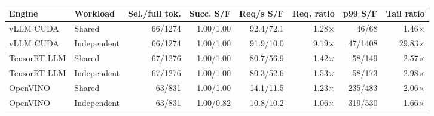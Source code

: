 \begin{tabular}{llrrrrrr}
\toprule
Engine & Workload & Sel./full tok. & Succ. S/F & Req/s S/F & Req. ratio & p99 S/F & Tail ratio \\
\midrule
vLLM CUDA & Shared & 66/1274 & 1.00/1.00 & 92.4/72.1 & 1.28$\times$ & 46/68 & 1.46$\times$ \\
vLLM CUDA & Independent & 66/1274 & 1.00/1.00 & 91.9/10.0 & 9.19$\times$ & 47/1408 & 29.83$\times$ \\
TensorRT-LLM & Shared & 67/1276 & 1.00/1.00 & 80.7/56.9 & 1.42$\times$ & 58/149 & 2.57$\times$ \\
TensorRT-LLM & Independent & 67/1276 & 1.00/1.00 & 80.3/52.6 & 1.53$\times$ & 58/173 & 2.98$\times$ \\
OpenVINO & Shared & 63/831 & 1.00/1.00 & 14.1/11.5 & 1.23$\times$ & 235/483 & 2.06$\times$ \\
OpenVINO & Independent & 63/831 & 1.00/0.82 & 10.8/10.2 & 1.06$\times$ & 319/530 & 1.66$\times$ \\
\bottomrule
\end{tabular}
